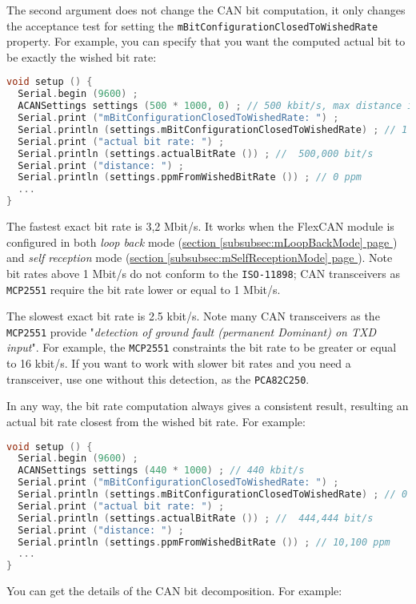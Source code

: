 \documentclass[9pt, a4paper, obeyspaces, openany]{extarticle}
\newcommand\refSubsubsectionPage[1]{\hyperref[subsubsec:#1]{section \ref*{subsubsec:#1} page \pageref{subsubsec:#1}}}
\begin{document}
The second argument does not change the CAN bit computation, it only changes the acceptance test for setting the \texttt{mBitConfigurationClosedToWishedRate} property. For example, you can specify that you want the computed actual bit to be exactly the wished bit rate:
{ \small\begin{lstlisting}[language=c++]
void setup () {
  Serial.begin (9600) ;
  ACANSettings settings (500 * 1000, 0) ; // 500 kbit/s, max distance is 0 ppm
  Serial.print ("mBitConfigurationClosedToWishedRate: ") ;
  Serial.println (settings.mBitConfigurationClosedToWishedRate) ; // 1 (--> is true)
  Serial.print ("actual bit rate: ") ;
  Serial.println (settings.actualBitRate ()) ; //  500,000 bit/s
  Serial.print ("distance: ") ;
  Serial.println (settings.ppmFromWishedBitRate ()) ; // 0 ppm
  ...
}
\end{lstlisting}}

The fastest exact bit rate is 3,2 Mbit/s. It works when the FlexCAN module is configured in both \emph{loop back} mode (\refSubsubsectionPage{mLoopBackMode}) and \emph{self reception} mode (\refSubsubsectionPage{mSelfReceptionMode}). Note bit rates above 1 Mbit/s do not conform to the \texttt{ISO-11898}; CAN transceivers as \texttt{MCP2551} require the bit rate lower or equal to 1 Mbit/s.


The slowest exact bit rate is 2.5 kbit/s. Note many CAN transceivers as the \texttt{MCP2551} provide "\emph{detection of ground fault (permanent Dominant) on TXD input}". For example, the \texttt{MCP2551} constraints the bit rate to be greater or equal to 16 kbit/s. If you want to work with slower bit rates and you need a transceiver, use one without this detection, as the \texttt{PCA82C250}.


In any way, the bit rate computation always gives a consistent result, resulting an actual bit rate closest from the wished bit rate. For example:
{ \small\begin{lstlisting}[language=c++]
void setup () {
  Serial.begin (9600) ;
  ACANSettings settings (440 * 1000) ; // 440 kbit/s 
  Serial.print ("mBitConfigurationClosedToWishedRate: ") ;
  Serial.println (settings.mBitConfigurationClosedToWishedRate) ; // 0 (--> is false)
  Serial.print ("actual bit rate: ") ;
  Serial.println (settings.actualBitRate ()) ; //  444,444 bit/s
  Serial.print ("distance: ") ;
  Serial.println (settings.ppmFromWishedBitRate ()) ; // 10,100 ppm
  ...
}
\end{lstlisting}}

You can get the details of the CAN bit decomposition. For example:
\end{document}
